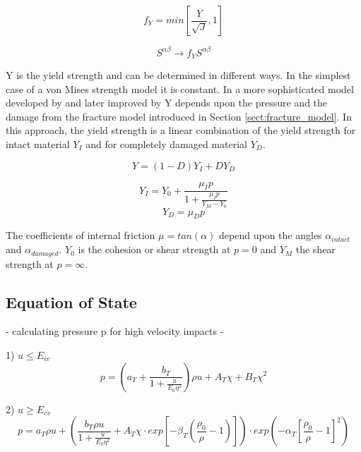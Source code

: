 \begin{equation}
    f_Y = min \left[\frac{Y}{\sqrt{J}}, 1 \right]
\end{equation}

\begin{equation}
    S^{\alpha \beta} \rightarrow f_Y S^{\alpha \beta}
\end{equation}

Y is the yield strength and can be determined in different ways. In the simplest case of a von Mises strength model it is constant. In a more sophisticated model developed by \cite{Collins_2004} and later improved by \cite{Jutzi_2015} Y depends upon the pressure and the damage from the fracture model introduced in Section \ref{sect:fracture_model}. In this approach, the yield strength is a linear combination of the yield strength for intact material $Y_I$ and for completely damaged material $Y_D$.

\begin{equation}
    Y = \left(1 - D \right)Y_I + DY_D
\end{equation}

\begin{equation}
    Y_I = Y_0 + \frac{\mu_I p}{1 + \frac{\mu_I p}{Y_M - Y_0}}
\end{equation}
\begin{equation}
    Y_D = \mu_D p
\end{equation}

The coefficients of internal friction $\mu = tan(\alpha)$ depend upon the angles $\alpha_{intact}$ and $\alpha_{damaged}$. $Y_0$ is the cohesion or shear strength at $p = 0$ and $Y_M$ the shear strength at $p = \infty$.


\subsection{Equation of State}
- calculating pressure p for high velocity impacts
- \cite{Tillotson_1962}

1) $u \leq E_{iv}$
\begin{equation}
    p = (a_T + \frac{b_T}{1 + \frac{u}{E_0\eta^2}})\rho u + A_T \chi + B_T \chi^2
\end{equation}


2) $u \geq E_{cv}$
\begin{equation}
    p = a_T \rho u + \left( \frac{b_T \rho u}{1 + \frac{u}{E_0 \eta^2}} + A_T \chi \cdot exp\left[-\beta_T\left(\frac{\rho_0}{\rho} - 1\right)\right] \right) \cdot exp \left(-\alpha_T \left[\frac{\rho_0}{\rho} - 1 \right]^2 \right)
\end{equation}


